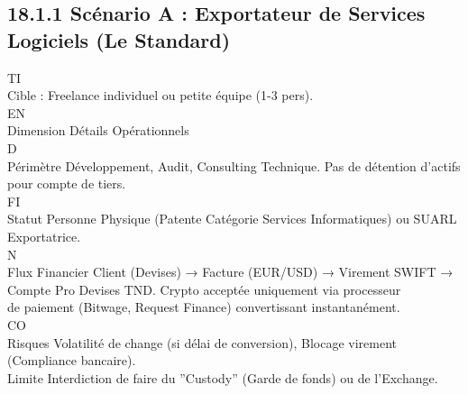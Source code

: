 \documentclass[12pt,landscape,a4paper]{article}
\begin{document}
\subsection{18.1.1 Scénario A : Exportateur de Services Logiciels (Le Standard)}
\vspace{0.5em}
\vspace{0.5em}
\vspace{0.5em}
\vspace{0.5em}
TI\\
Cible : Freelance individuel ou petite équipe (1-3 pers).\\
\vspace{0.5em}
\vspace{0.5em}
\vspace{0.5em}
\vspace{0.5em}
EN\\
Dimension      Détails Opérationnels\\
\vspace{0.5em}
\vspace{0.5em}
\vspace{0.5em}
\vspace{0.5em}
D\\
Périmètre      Développement, Audit, Consulting Technique. Pas de détention d’actifs pour compte de tiers.\\
\vspace{0.5em}
\vspace{0.5em}
\vspace{0.5em}
\vspace{0.5em}
FI\\
Statut         Personne Physique (Patente Catégorie Services Informatiques) ou SUARL Exportatrice.\\
\vspace{0.5em}
\vspace{0.5em}
N\\
Flux Financier Client (Devises) → Facture (EUR/USD) → Virement SWIFT → Compte Pro Devises TND. Crypto acceptée uniquement via processeur\\
de paiement (Bitwage, Request Finance) convertissant instantanément.\\
CO\\
Risques        Volatilité de change (si délai de conversion), Blocage virement (Compliance bancaire).\\
Limite         Interdiction de faire du ”Custody” (Garde de fonds) ou de l’Exchange.\\
\vspace{0.5em}
\vspace{0.5em}
\vspace{0.5em}
\end{document}
